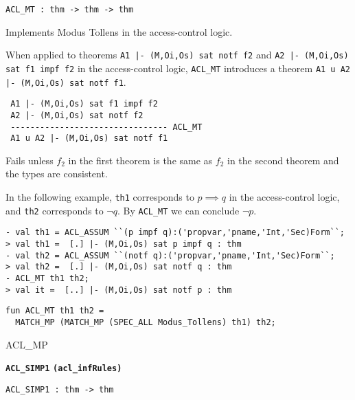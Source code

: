 \begin{verbatim}
ACL_MT : thm -> thm -> thm
\end{verbatim}

\SYNOPSIS
Implements Modus Tollens in the access-control logic.

\DESCRIBE
When applied to theorems \texttt{A1 |- (M,Oi,Os) sat notf f2} and
\texttt{A2 |- (M,Oi,Os) sat f1 impf f2} in the access-control logic,
\texttt{ACL_MT} introduces a theorem \texttt{A1 u A2 |- (M,Oi,Os) sat notf f1}.
\begin{verbatim}
 A1 |- (M,Oi,Os) sat f1 impf f2    
 A2 |- (M,Oi,Os) sat notf f2
 -------------------------------- ACL_MT
 A1 u A2 |- (M,Oi,Os) sat notf f1
\end{verbatim}

\FAILURE
Fails unless $f_2$ in the first theorem is the same as $f_2$ in the second
theorem and the types are consistent.

\EXAMPLE
In the following example, \texttt{th1} corresponds to $p \implies q$
in the access-control logic, and \texttt{th2} corresponds to $\neg
q$. By \texttt{ACL\_MT} we can conclude $\neg p$.
\begin{holboxed}
\begin{verbatim}
- val th1 = ACL_ASSUM ``(p impf q):('propvar,'pname,'Int,'Sec)Form``;
> val th1 =  [.] |- (M,Oi,Os) sat p impf q : thm
- val th2 = ACL_ASSUM ``(notf q):('propvar,'pname,'Int,'Sec)Form``;
> val th2 =  [.] |- (M,Oi,Os) sat notf q : thm
- ACL_MT th1 th2;
> val it =  [..] |- (M,Oi,Os) sat notf p : thm
\end{verbatim}
\end{holboxed}
\IMPLEMENTATION
\begin{holboxed}
\begin{verbatim}
fun ACL_MT th1 th2 = 
  MATCH_MP (MATCH_MP (SPEC_ALL Modus_Tollens) th1) th2;
\end{verbatim}
\end{holboxed}

\SEEALSO
ACL\_MP
\ENDDOC

\begin{holboxed}
  \begin{Large}
    \textbf{\texttt{ACL\_SIMP1}} \hfill{}\textbf{\texttt{(acl\_infRules)}}
  \end{Large}
\end{holboxed}
\begin{verbatim}
ACL_SIMP1 : thm -> thm
\end{verbatim}

